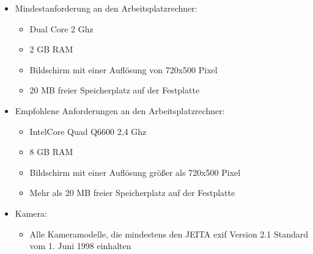 	\begin{itemize}
		
		\item Mindestanforderung an den Arbeitsplatzrechner: 
		\begin{itemize}
			\item Dual Core 2 Ghz
			\item 2 GB RAM
			\item Bildschirm mit einer Auflösung von 720x500 Pixel
			\item 20 MB freier Speicherplatz auf der Festplatte
		\end{itemize}
	
		\item Empfohlene Anforderungen an den Arbeitsplatzrechner:
		\begin{itemize}
			\item Intel\textregistered Core Quad Q6600 2,4 Ghz
			\item 8 GB RAM
			\item Bildschirm mit einer Auflösung größer als 720x500 Pixel
			\item Mehr als 20 MB freier Speicherplatz auf der Festplatte
		\end{itemize}	
	
		\item Kamera:
		\begin{itemize}
			\item Alle Kameramodelle, die mindestens den JEITA \gls{exif} Version 2.1 Standard vom 1. Juni 1998 einhalten
		\end{itemize}
		
	\end{itemize}
